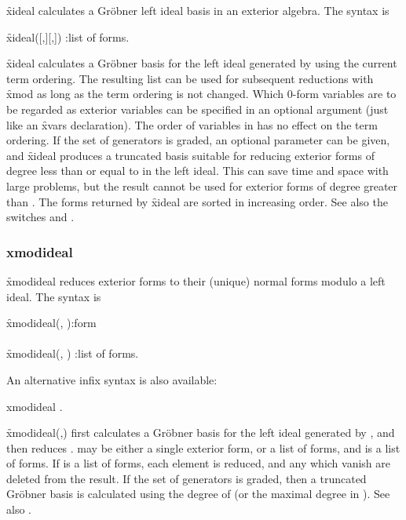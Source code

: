 \hypertarget{operator:XIDEAL}{}
\f{xideal} calculates a Gr{\"o}bner left ideal basis in
an exterior algebra. The syntax is
\begin{syntax}
     \f{xideal}([,][,])
           :list of forms.
\end{syntax}
\f{xideal} calculates a Gr{\"o}bner basis for the left ideal generated by
 using the current term ordering. The resulting list can be used for
subsequent reductions with \f{xmod} as long as the term ordering is not
changed. Which 0-form variables are to be regarded as exterior variables
can be specified in an optional argument  (just like an \f{xvars}
declaration). The order of variables in  has no effect on the term
ordering. If the set of generators  is graded, an optional parameter
 can be given, and \f{xideal} produces a truncated basis suitable for
reducing exterior forms of degree less than or equal to  in the left
ideal. This can save time and space with large problems, but the result
cannot be used for exterior forms of degree greater than . The forms
returned by \f{xideal} are sorted in increasing order. See also the
switches  and .


\subsubsection*{xmodideal}

\hypertarget{operator:XMODIDEAL}{}
\f{xmodideal} reduces exterior forms to their (unique) normal forms modulo
a left ideal. The syntax is
\begin{syntaxtable}
     \f{xmodideal}(, ):form \\
     \\
     \f{xmodideal}(, )
              :list of forms.
\end{syntaxtable}
An alternative infix syntax is also available:
\begin{syntax}
      xmodideal  .
\end{syntax}
\f{xmodideal}(,) first calculates a Gr{\"o}bner basis for the left ideal
generated by , and then reduces .  may be either a single
exterior form, or a list of forms, and  is a list of forms. If 
is a list of forms, each element is reduced, and any which vanish are
deleted from the result. 
If the set of generators  is graded, then a truncated Gr{\"o}bner basis
is calculated using the degree of  (or the maximal degree in
). See also .



